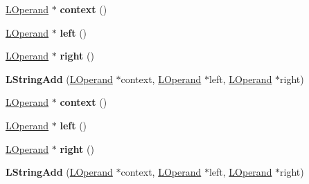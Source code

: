 \begin{DoxyCompactItemize}
\item 
\hyperlink{classv8_1_1internal_1_1_l_operand}{L\+Operand} $\ast$ {\bfseries context} ()\hypertarget{classv8_1_1internal_1_1_l_string_add_a607556e17316f1fd938b9e8731005f46}{}\label{classv8_1_1internal_1_1_l_string_add_a607556e17316f1fd938b9e8731005f46}

\item 
\hyperlink{classv8_1_1internal_1_1_l_operand}{L\+Operand} $\ast$ {\bfseries left} ()\hypertarget{classv8_1_1internal_1_1_l_string_add_a67ecfc808a49ae160114f0e53f366037}{}\label{classv8_1_1internal_1_1_l_string_add_a67ecfc808a49ae160114f0e53f366037}

\item 
\hyperlink{classv8_1_1internal_1_1_l_operand}{L\+Operand} $\ast$ {\bfseries right} ()\hypertarget{classv8_1_1internal_1_1_l_string_add_ae0c15e935d032468c5b8e4b12d3dd71f}{}\label{classv8_1_1internal_1_1_l_string_add_ae0c15e935d032468c5b8e4b12d3dd71f}

\item 
{\bfseries L\+String\+Add} (\hyperlink{classv8_1_1internal_1_1_l_operand}{L\+Operand} $\ast$context, \hyperlink{classv8_1_1internal_1_1_l_operand}{L\+Operand} $\ast$left, \hyperlink{classv8_1_1internal_1_1_l_operand}{L\+Operand} $\ast$right)\hypertarget{classv8_1_1internal_1_1_l_string_add_a8c7a0225dcb0347fca518802f8caa913}{}\label{classv8_1_1internal_1_1_l_string_add_a8c7a0225dcb0347fca518802f8caa913}

\item 
\hyperlink{classv8_1_1internal_1_1_l_operand}{L\+Operand} $\ast$ {\bfseries context} ()\hypertarget{classv8_1_1internal_1_1_l_string_add_a607556e17316f1fd938b9e8731005f46}{}\label{classv8_1_1internal_1_1_l_string_add_a607556e17316f1fd938b9e8731005f46}

\item 
\hyperlink{classv8_1_1internal_1_1_l_operand}{L\+Operand} $\ast$ {\bfseries left} ()\hypertarget{classv8_1_1internal_1_1_l_string_add_a67ecfc808a49ae160114f0e53f366037}{}\label{classv8_1_1internal_1_1_l_string_add_a67ecfc808a49ae160114f0e53f366037}

\item 
\hyperlink{classv8_1_1internal_1_1_l_operand}{L\+Operand} $\ast$ {\bfseries right} ()\hypertarget{classv8_1_1internal_1_1_l_string_add_ae0c15e935d032468c5b8e4b12d3dd71f}{}\label{classv8_1_1internal_1_1_l_string_add_ae0c15e935d032468c5b8e4b12d3dd71f}

\item 
{\bfseries L\+String\+Add} (\hyperlink{classv8_1_1internal_1_1_l_operand}{L\+Operand} $\ast$context, \hyperlink{classv8_1_1internal_1_1_l_operand}{L\+Operand} $\ast$left, \hyperlink{classv8_1_1internal_1_1_l_operand}{L\+Operand} $\ast$right)\hypertarget{classv8_1_1internal_1_1_l_string_add_a8c7a0225dcb0347fca518802f8caa913}{}\label{classv8_1_1internal_1_1_l_string_add_a8c7a0225dcb0347fca518802f8caa913}


\end{DoxyCompactItemize}
